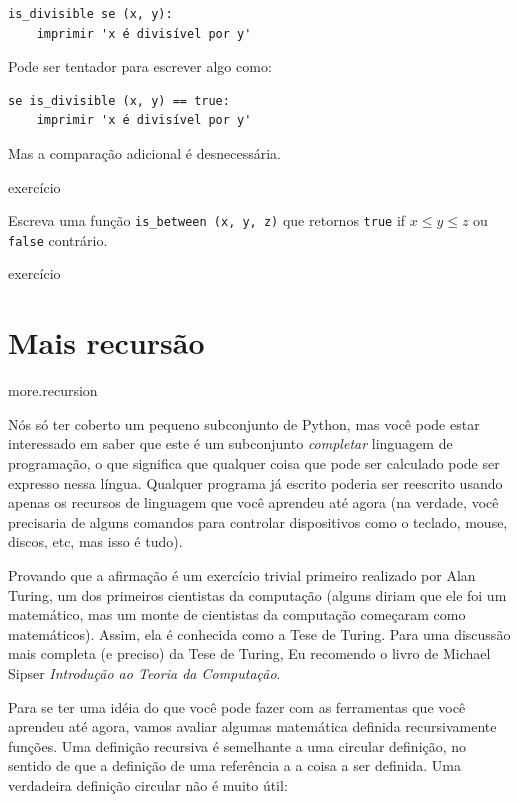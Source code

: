 \documentclass[10pt]{book}
\begin{document}
{{{\begin{verbatim}
is_divisible se (x, y):
    imprimir 'x é divisível por y'
\end{verbatim}
%
Pode ser tentador para escrever algo como:

\begin{verbatim}
se is_divisible (x, y) == true:
    imprimir 'x é divisível por y'
\end{verbatim}
%
Mas a comparação adicional é desnecessária.

\begin{} exercício

Escreva uma função \verb "is_between (x, y, z)" que
retornos {\tt true} if $ x \le y \le z $ ou {\tt false} contrário.

\end{} exercício


\section{Mais recursão}
\label{} more.recursion

Nós só ter coberto um pequeno subconjunto de Python, mas você pode
estar interessado em saber que este é um subconjunto {\em completar}
linguagem de programação, o que significa que qualquer coisa que pode ser
calculado pode ser expresso nessa língua. Qualquer programa já escrito
poderia ser reescrito usando apenas os recursos de linguagem que você aprendeu
até agora (na verdade, você precisaria de alguns comandos para controlar dispositivos
como o teclado, mouse, discos, etc, mas isso é tudo).

Provando que a afirmação é um exercício trivial primeiro realizado por Alan
Turing, um dos primeiros cientistas da computação (alguns diriam que ele
foi um matemático, mas um monte de cientistas da computação começaram como
matemáticos). Assim, ela é conhecida como a Tese de Turing.
Para uma discussão mais completa (e preciso) da Tese de Turing,
Eu recomendo o livro de Michael Sipser {\em Introdução ao
Teoria da Computação}.

Para se ter uma idéia do que você pode fazer com as ferramentas que você aprendeu
até agora, vamos avaliar algumas matemática definida recursivamente
funções. Uma definição recursiva é semelhante a uma circular
definição, no sentido de que a definição de uma referência a
a coisa a ser definida. Uma verdadeira definição circular não é muito
útil:

}}}
\end{document}
